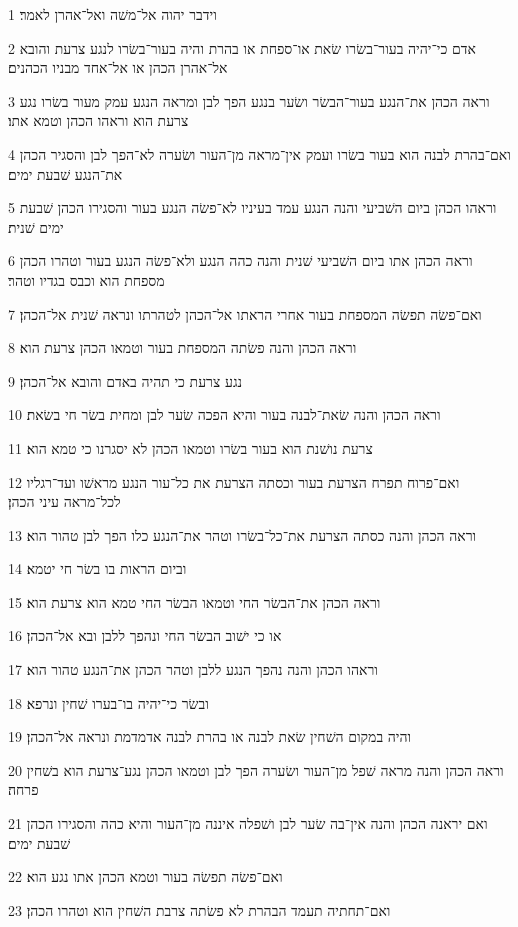 \par 1 וידבר יהוה אל־משׁה ואל־אהרן לאמר׃
\par 2 אדם כי־יהיה בעור־בשׂרו שׂאת או־ספחת או בהרת והיה בעור־בשׂרו לנגע צרעת והובא אל־אהרן הכהן או אל־אחד מבניו הכהנים׃
\par 3 וראה הכהן את־הנגע בעור־הבשׂר ושׂער בנגע הפך לבן ומראה הנגע עמק מעור בשׂרו נגע צרעת הוא וראהו הכהן וטמא אתו׃
\par 4 ואם־בהרת לבנה הוא בעור בשׂרו ועמק אין־מראה מן־העור ושׂערה לא־הפך לבן והסגיר הכהן את־הנגע שׁבעת ימים׃
\par 5 וראהו הכהן ביום השׁביעי והנה הנגע עמד בעיניו לא־פשׂה הנגע בעור והסגירו הכהן שׁבעת ימים שׁנית׃
\par 6 וראה הכהן אתו ביום השׁביעי שׁנית והנה כהה הנגע ולא־פשׂה הנגע בעור וטהרו הכהן מספחת הוא וכבס בגדיו וטהר׃
\par 7 ואם־פשׂה תפשׂה המספחת בעור אחרי הראתו אל־הכהן לטהרתו ונראה שׁנית אל־הכהן׃
\par 8 וראה הכהן והנה פשׂתה המספחת בעור וטמאו הכהן צרעת הוא׃
\par 9 נגע צרעת כי תהיה באדם והובא אל־הכהן׃
\par 10 וראה הכהן והנה שׂאת־לבנה בעור והיא הפכה שׂער לבן ומחית בשׂר חי בשׂאת׃
\par 11 צרעת נושׁנת הוא בעור בשׂרו וטמאו הכהן לא יסגרנו כי טמא הוא׃
\par 12 ואם־פרוח תפרח הצרעת בעור וכסתה הצרעת את כל־עור הנגע מראשׁו ועד־רגליו לכל־מראה עיני הכהן׃
\par 13 וראה הכהן והנה כסתה הצרעת את־כל־בשׂרו וטהר את־הנגע כלו הפך לבן טהור הוא׃
\par 14 וביום הראות בו בשׂר חי יטמא׃
\par 15 וראה הכהן את־הבשׂר החי וטמאו הבשׂר החי טמא הוא צרעת הוא׃
\par 16 או כי ישׁוב הבשׂר החי ונהפך ללבן ובא אל־הכהן׃
\par 17 וראהו הכהן והנה נהפך הנגע ללבן וטהר הכהן את־הנגע טהור הוא׃
\par 18 ובשׂר כי־יהיה בו־בערו שׁחין ונרפא׃
\par 19 והיה במקום השׁחין שׂאת לבנה או בהרת לבנה אדמדמת ונראה אל־הכהן׃
\par 20 וראה הכהן והנה מראה שׁפל מן־העור ושׂערה הפך לבן וטמאו הכהן נגע־צרעת הוא בשׁחין פרחה׃
\par 21 ואם יראנה הכהן והנה אין־בה שׂער לבן ושׁפלה איננה מן־העור והיא כהה והסגירו הכהן שׁבעת ימים׃
\par 22 ואם־פשׂה תפשׂה בעור וטמא הכהן אתו נגע הוא׃
\par 23 ואם־תחתיה תעמד הבהרת לא פשׂתה צרבת השׁחין הוא וטהרו הכהן׃
